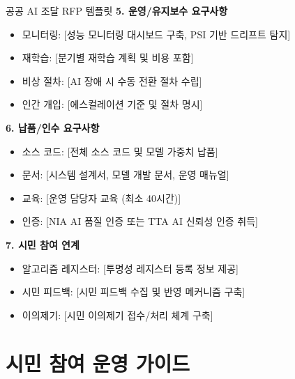 \begin{practicaltool}{공공 AI 조달 RFP 템플릿}
\textbf{5. 운영/유지보수 요구사항}
\begin{itemize}
    \item 모니터링: [성능 모니터링 대시보드 구축, PSI 기반 드리프트 탐지]
    \item 재학습: [분기별 재학습 계획 및 비용 포함]
    \item 비상 절차: [AI 장애 시 수동 전환 절차 수립]
    \item 인간 개입: [에스컬레이션 기준 및 절차 명시]
\end{itemize}

\textbf{6. 납품/인수 요구사항}
\begin{itemize}
    \item 소스 코드: [전체 소스 코드 및 모델 가중치 납품]
    \item 문서: [시스템 설계서, 모델 개발 문서, 운영 매뉴얼]
    \item 교육: [운영 담당자 교육 (최소 40시간)]
    \item 인증: [NIA AI 품질 인증 또는 TTA AI 신뢰성 인증 취득]
\end{itemize}

\textbf{7. 시민 참여 연계}
\begin{itemize}
    \item 알고리즘 레지스터: [투명성 레지스터 등록 정보 제공]
    \item 시민 피드백: [시민 피드백 수집 및 반영 메커니즘 구축]
    \item 이의제기: [시민 이의제기 접수/처리 체계 구축]
\end{itemize}
\end{practicaltool}

\section{시민 참여 운영 가이드}
\label{sec:18.6}

